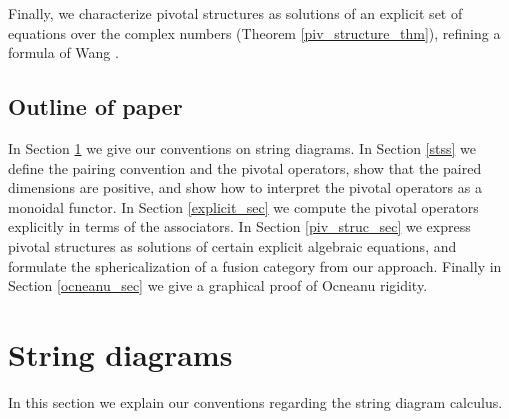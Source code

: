 \documentclass[a4paper]{article}
\theoremstyle{plain}
\theoremstyle{definition}
\begin{document}
Finally, we characterize pivotal structures as solutions of an explicit set of equations over the complex numbers (Theorem \ref{piv_structure_thm}), refining a formula of Wang \cite[Prop 4.17]{wang2010-topological}.


\subsection*{Outline of paper}

In Section \ref{string_sec} we give our conventions on string diagrams. In Section \ref{stss} we define the pairing convention and the pivotal operators, show that the paired dimensions are positive, and show how to interpret the pivotal operators as a monoidal functor. In Section \ref{explicit_sec} we compute the pivotal operators explicitly in terms of the associators. In Section \ref{piv_struc_sec} we express pivotal structures as solutions of certain explicit algebraic equations, and formulate the sphericalization of a fusion category from our approach. Finally in Section \ref{ocneanu_sec} we give a graphical proof of Ocneanu rigidity. 



\section{String diagrams} \label{string_sec}
In this section we explain our conventions regarding the string diagram calculus.
\end{document}
